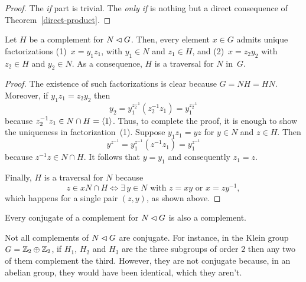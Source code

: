 \begin{proof} The \textit{if\/} part is trivial. The \textit{only if\/} is nothing but a direct consequence of Theorem~\ref{direct-product}.  \end{proof}

\begin{prop}\label{split-element}
    Let\/ $H$ be a complement for $N\lhd G$. Then, every element\/ $x\in G$ admits unique factorizations\/ {\upshape (1)}~$x=y_1z_1$, with\/ $y_1\in N$ and\/ $z_1\in H$, and {\upshape (2)}~$x=z_2y_2$ with\/ $z_2\in H$ and\/ $y_2\in N$. As a consequence, $H$ is a traversal for\/ $N$ in\/~$G$. 
\end{prop}

\begin{proof}
    The existence of such factorizations is clear because $G=NH=HN$. Moreover, if $y_1z_1=z_2y_2$ then
    $$
        y_2=y_1^{z_2^{-1}}(z_2^{-1}z_1)=y_1^{z_2^{-1}}
    $$
    because $z_2^{-1}z_1\in N\cap H=\langle1\rangle$. Thus, to complete the proof, it is enough to show the uniqueness in factorization~(1). Suppose $y_1z_1=yz$ for $y\in N$ and $z\in H$. Then
    $$
        y^{z^{-1}} = y_1^{z^{-1}}(z^{-1}z_1)= y_1^{z^{-1}}
    $$
    because $z^{-1}z\in N\cap H$. It follows that $y=y_1$ and consequently $z_1=z$.
    
    Finally, $H$ is a traversal for $N$ because
    $$
        z\in xN\cap H \iff \exists\, y\in N \text{ with }z=xy
            \text{ or } x=zy^{-1},
    $$
    which happens for a single pair $(z,y)$, as shown above.  
\end{proof}

\begin{rem}
    Every conjugate of a complement for $N\lhd G$ is also a complement.
\end{rem}

\begin{xmpl}
    Not all complements of\/ $N\lhd G$ are conjugate. For instance, in the Klein group\/ $G=\mathbb{Z}_2\oplus\mathbb{Z}_2$, if $H_1$, $H_2$ and $H_3$ are the three subgroups of order $2$ then any two of them complement the third. However, they are not conjugate because, in an abelian group, they would have been identical, which they aren't. 
\end{xmpl}

